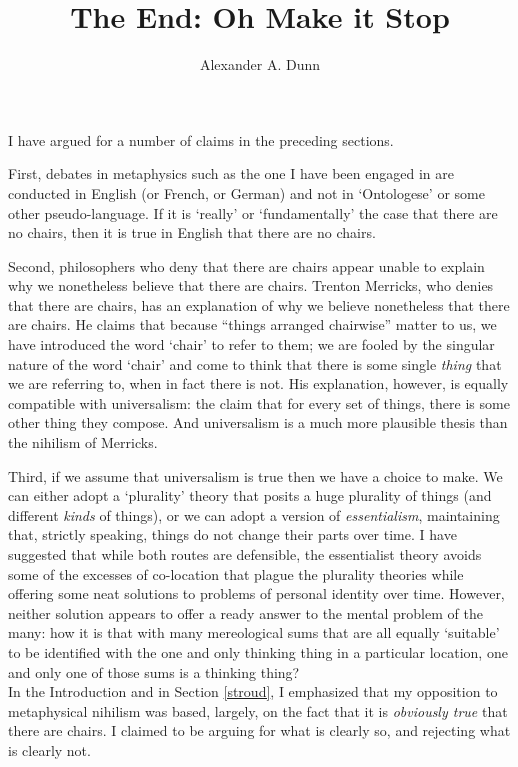 \documentclass[11pt]{article}
\title{The End: Oh Make it Stop}
\author{Alexander A. Dunn}
\begin{document}
\ifstandalone
\maketitle
\begin{spacing}{1.5}
\fi

I have argued for a number of claims in the preceding sections.

First, debates in metaphysics such as the one I have been engaged in
are conducted in English (or French, or German) and not in
`Ontologese' or some other pseudo-language.  If it is `really' or
`fundamentally' the case that there are no chairs, then it is true in
English that there are no chairs.

Second, philosophers who deny that there are chairs appear unable to
explain why we nonetheless believe that there are chairs.  Trenton
Merricks, who denies that there are chairs, has an explanation of why
we believe nonetheless that there are chairs.  He claims that because
``things arranged chairwise'' matter to us, we have introduced the
word `chair' to refer to them; we are fooled by the singular nature of
the word `chair' and come to think that there is some single {\em
  thing} that we are referring to, when in fact there is not.  His
explanation, however, is equally compatible with universalism: the
claim that for every set of things, there is some other thing they
compose.  And universalism is a much more plausible thesis than the
nihilism of Merricks.

Third, if we assume that universalism is true then we have a choice to
make.  We can either adopt a `plurality' theory that posits a huge
plurality of things (and different {\em kinds} of things), or we can
adopt a version of {\em essentialism}, maintaining that, strictly
speaking, things do not change their parts over time.  I have
suggested that while both routes are defensible, the essentialist
theory avoids some of the excesses of co-location that plague the
plurality theories while offering some neat solutions to problems of
personal identity over time.  However, neither solution appears to
offer a ready answer to the mental problem of the many: how it is that
with many mereological sums that are all equally `suitable' to be
identified with the one and only thinking thing in a particular
location, one and only one of those sums is a thinking thing? \\

In the Introduction and in Section \ref{stroud}, I emphasized that my
opposition to metaphysical nihilism was based, largely, on the fact
that it is {\em obviously true} that there are chairs.  I claimed to
be arguing for what is clearly so, and rejecting what is clearly not.


\end{spacing}
\end{document}
